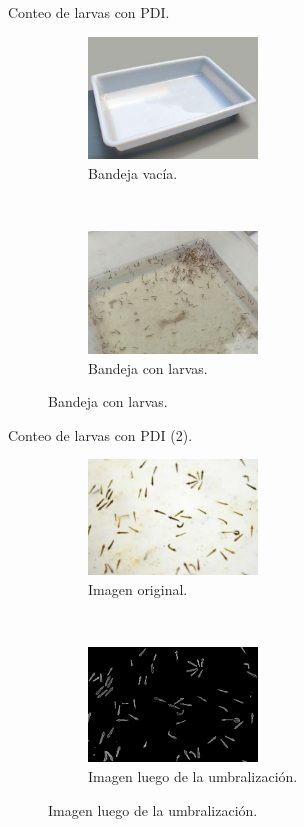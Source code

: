 \begin{frame}[c]{Conteo de larvas con PDI.}
    \begin{figure}
    \begin{subfigure}[b]{0.45\textwidth}
        \includegraphics[width=4.5cm]{../book/capitulo-5/graphics/bandeja-muestra.jpg}
        \caption{Bandeja vacía.}
    \end{subfigure}
    ~~~~
    \begin{subfigure}[b]{0.45\textwidth}
        \includegraphics[width=4.5cm]{../book/capitulo-5/graphics/larvas-dengue.jpg}
        \caption{Bandeja con larvas.}
    \end{subfigure}
    \end{figure}
\end{frame}

\begin{frame}[c]{Conteo de larvas con PDI (2).}
    \begin{figure}
    \begin{subfigure}[t]{0.45\textwidth}
        \includegraphics[width=4.5cm]{../book/capitulo-5/graphics/larvas-original.png}
        \caption{Imagen original.}
    \end{subfigure}
    ~~~~
    \begin{subfigure}[t]{0.45\textwidth}
        \includegraphics[width=4.5cm]{../book/capitulo-5/graphics/larvas-otsu.png}
        \caption{Imagen luego de la umbralización.}
    \end{subfigure}
    \end{figure}
\end{frame}

